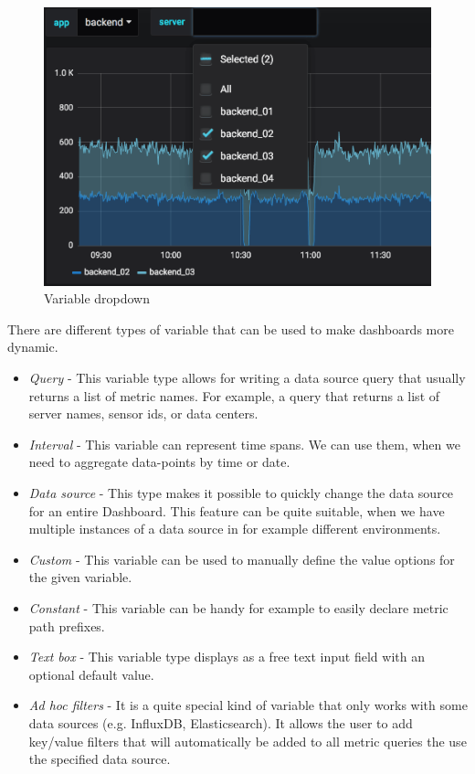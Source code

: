 \begin{figure}[H]
	\centering
	\includegraphics[width=130mm, keepaspectratio]{figures/variable-dropdown.png}
	\caption{Variable dropdown \cite{grafana-variables-dashboard-image}}
	\label{fig:variable-dropdown}
\end{figure}


There are different types of variable that can be used to make dashboards more dynamic.\cite{grafana-variables-types}
\begin{itemize}
	\item \emph{Query} - This variable type allows for writing a data source query that usually returns a list of metric names. For example, a query that returns a list of server names, sensor ids, or data centers.
	\item \emph{Interval} - This variable can represent time spans. We can use them, when we need to aggregate data-points by time or date.
	\item \emph{Data source} - This type makes it possible to quickly change the data source for an entire Dashboard. This feature can be quite suitable, when we have multiple instances of a data source in for example different environments.
	\item \emph{Custom} - This variable can be used to manually define the value options for the given variable.
	\item \emph{Constant} - This variable can be handy for example to easily declare metric path prefixes. 
	\item \emph{Text box} - This variable type displays as a free text input field with an optional default value.
	\item \emph{Ad hoc filters} - It is a quite special kind of variable that only works with some data sources (e.g. InfluxDB, Elasticsearch). It allows the user to add key/value filters that will automatically be added to all metric queries the use the specified data source.
\end{itemize}

